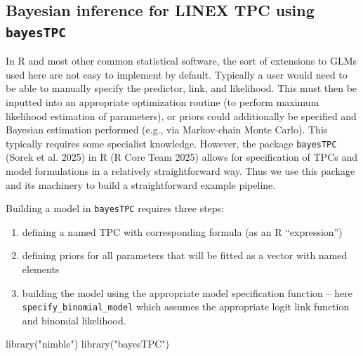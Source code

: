 \documentclass[
]{article}
\newenvironment{Shaded}{\begin{snugshade}}{\end{snugshade}}
\newcommand{\FunctionTok}[1]{\textcolor[rgb]{0.28,0.35,0.67}{#1}}
\newcommand{\NormalTok}[1]{\textcolor[rgb]{0.00,0.23,0.31}{#1}}
\newcommand{\StringTok}[1]{\textcolor[rgb]{0.13,0.47,0.30}{#1}}
\providecommand{\tightlist}{%
  \setlength{\itemsep}{0pt}\setlength{\parskip}{0pt}}\usepackage{longtable,booktabs,array}
\begin{document}
\subsection{\texorpdfstring{Bayesian inference for LINEX TPC using
\texttt{bayesTPC}}{Bayesian inference for LINEX TPC using bayesTPC}}\label{bayesian-inference-for-linex-tpc-using-bayestpc}

In R and most other common statistical software, the sort of extensions
to GLMs used here are not easy to implement by default. Typically a user
would need to be able to manually specify the predictor, link, and
likelihood. This must then be inputted into an appropriate optimization
routine (to perform maximum likelihood estimation of parameters), or
priors could additionally be specified and Bayesian estimation performed
(e.g., via Markov-chain Monte Carlo). This typically requires some
specialist knowledge. However, the package \texttt{bayesTPC} (Sorek et
al. 2025) in R (R Core Team 2025) allows for specification of TPCs and
model formulations in a relatively straightforward way. Thus we use this
package and its machinery to build a straightforward example pipeline.

Building a model in \texttt{bayesTPC} requires three steps:

\begin{enumerate}
\def\labelenumi{\arabic{enumi})}
\tightlist
\item
  defining a named TPC with corresponding formula (as an R
  ``expression'')
\item
  defining priors for all parameters that will be fitted as a vector
  with named elements
\item
  building the model using the appropriate model specification function
  -- here \texttt{specify\_binomial\_model} which assumes the
  appropriate logit link function and binomial likelihood.
\end{enumerate}

\begin{Shaded}
\begin{Highlighting}[]
\FunctionTok{library}\NormalTok{(}\StringTok{"nimble"}\NormalTok{)}
\FunctionTok{library}\NormalTok{(}\StringTok{"bayesTPC"}\NormalTok{)}
\end{Highlighting}
\end{Shaded}
\end{document}
